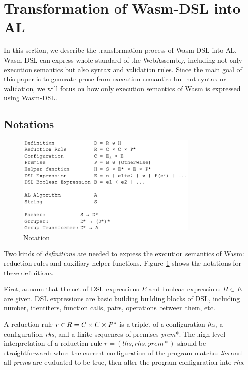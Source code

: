 \section{Transformation of Wasm-DSL into AL}\label{sec:translate}

In this section, we describe the transformation process of Wasm-DSL into AL.
Wasm-DSL can express whole standard of the WebAssembly, including not only
execution semantics but also syntax and validation rules.
Since the main goal of this paper is to generate prose from execution semantics but not syntax or validation,
we will focus on how only execution semantics of Wasm is expressed using Wasm-DSL.

\subsection{Notations}
\begin{figure}
  \centering
  \includegraphics[width=0.8\textwidth]{../img/notation.png}
  \caption{Notation}
  \label{fig:notation}
\end{figure}

Two kinds of \textit{definitions} are needed to express the execution semantics of Wasm:
reduction rules and auxiliary helper functions.
Figure~\ref{fig:notation} shows the notations for these definitions.

First, assume that the set of DSL expressions $E$ and boolean expressions $B \subset E$ are given.
DSL expressions are basic building building blocks of DSL, including number, identifiers,
function calls, pairs, operations between them, etc. 

A reduction rule $r \in R = C \times C \times P^\ast$ is a triplet of a
configuration \textit{lhs}, a configuration \textit{rhs}, and a finite sequences of premises \textit{prem}*.
The high-level interpretation of a reduction rule $r = (lhs, rhs, prem*)$ should be straightforward:
when the current configuration of the program matches \textit{lhs} and all \textit{prem}s are
evaluated to be true, then alter the program configuration into \textit{rhs}.

